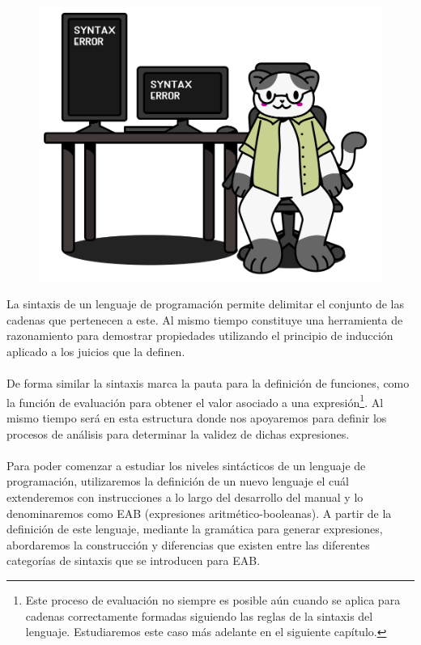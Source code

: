 
\begin{figure}[htbp]
    \centerline{\includegraphics[scale=.38]{assets/03_gatito_sintaxis.PNG}}       
\end{figure}


La sintaxis de un lenguaje de programación permite delimitar el conjunto de las cadenas que pertenecen a este. Al mismo tiempo constituye una herramienta de razonamiento para demostrar propiedades utilizando el principio de inducción aplicado a los juicios que la definen. \\\\
De forma similar la sintaxis marca la pauta para la definición de funciones, como la función de evaluación para obtener el valor asociado a una expresión\footnote{Este proceso de evaluación no siempre es posible aún cuando se aplica para cadenas correctamente formadas siguiendo las reglas de la sintaxis del lenguaje. Estudiaremos este caso más adelante en el siguiente capítulo.}.  Al mismo tiempo será en esta estructura donde nos apoyaremos para definir los procesos de análisis para determinar la validez de dichas expresiones.\\\\
Para poder comenzar a estudiar los niveles sintácticos de un lenguaje de programación, utilizaremos la definición de un nuevo lenguaje el cuál extenderemos con instrucciones a lo largo del desarrollo del manual y lo denominaremos como \textsf{EAB} (expresiones aritmético-booleanas). A partir de la definición de este lenguaje, mediante la gramática para generar expresiones, abordaremos la construcción y diferencias que existen entre las diferentes categorías de sintaxis que se introducen para \textsf{EAB}.
